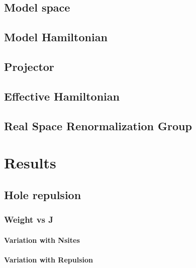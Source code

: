 \documentclass[ openright,titlepage,numbers=noenddot,headinclude,twoside,%
                footinclude=true,cleardoublepage=empty,abstractoff,%
                BCOR=5mm,paper=a4,fontsize=11pt,%
                ngerman,american,%
]{scrreprt}
\begin{document}
\section{Model space}

\section{Model Hamiltonian}

\section{Projector}

\section{Effective Hamiltonian}

\section{Real Space Renormalization Group}

\chapter{Results}

\section{Hole repulsion}


\subsection{Weight vs J}
\subsubsection{Variation with Nsites}
\subsubsection{Variation with Repulsion}
\end{document}
